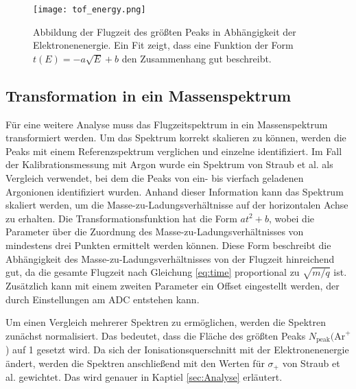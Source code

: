 \begin{figure}
    \centering
    \texttt{[image: tof\_energy.png]}
    \caption[Zusammenhang zwischen TOF und Elektronenenergie]{Abbildung der Flugzeit des größten Peaks in Abhängigkeit der Elektronenenergie. Ein Fit zeigt, dass eine Funktion der Form $t(E) = -a\sqrt{E} + b$ den Zusammenhang gut beschreibt.}
    \label{fig:tof_energy}
\end{figure}

\subsection{Transformation in ein Massenspektrum}
\label{sec:transformation}
Für eine weitere Analyse muss das Flugzeitspektrum in ein Massenspektrum transformiert werden. Um das Spektrum korrekt skalieren zu können, werden die Peaks mit einem Referenzspektrum verglichen und einzelne identifiziert. Im Fall der Kalibrationsmessung mit Argon wurde ein Spektrum von Straub et al. \cite{Straub} als Vergleich verwendet, bei dem die Peaks von ein- bis vierfach geladenen Argonionen identifiziert wurden. Anhand dieser Information kann das Spektrum skaliert werden, um die Masse-zu-Ladungsverhältnisse auf der horizontalen Achse zu erhalten. Die Transformationsfunktion hat die Form $at^2+b$, wobei die Parameter über die Zuordnung des Masse-zu-Ladungsverhältnisses von mindestens drei Punkten ermittelt werden können. Diese Form beschreibt die Abhängigkeit des Masse-zu-Ladungsverhältnisses von der Flugzeit hinreichend gut, da die gesamte Flugzeit nach Gleichung \ref{eq:time} proportional zu $\sqrt{m/q}$ ist. Zusätzlich kann mit einem zweiten Parameter ein Offset eingestellt werden, der durch Einstellungen am ADC entstehen kann. 

Um einen Vergleich mehrerer Spektren zu ermöglichen, werden die Spektren zunächst normalisiert. Das bedeutet, dass die Fläche des größten Peaks $N_\text{peak}(\text{Ar}^+$) auf 1 gesetzt wird. Da sich der Ionisationsquerschnitt mit der Elektronenenergie ändert, werden die Spektren anschließend mit den Werten für $\sigma_+$ von Straub et al. gewichtet. Das wird genauer in Kaptiel \ref{sec:Analyse} erläutert.

